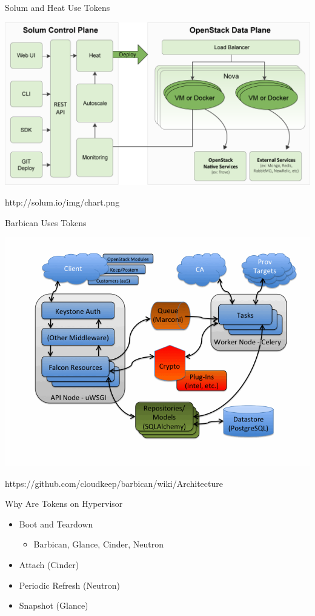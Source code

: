 \documentclass{beamer}
\begin{document}
\begin{frame}{Solum and Heat Use Tokens}
  \begin{block}{}
    \includegraphics[scale=0.3]{solum-arch.png}
  \end{block}
  http://solum.io/img/chart.png
\end {frame}

\begin{frame}{Barbican Uses Tokens}
  \begin{block}{}
    \includegraphics[scale=0.3]{barbican-arch.png}
  \end{block}
  https://github.com/cloudkeep/barbican/wiki/Architecture
\end {frame}


\begin{frame}{Why Are Tokens on Hypervisor}
  \begin{itemize}
  \item Boot and Teardown
    \begin{itemize}
    \item Barbican, Glance, Cinder, Neutron
    \end {itemize}
  \item Attach (Cinder)
  \item Periodic Refresh (Neutron)
  \item Snapshot (Glance)
  \end {itemize}
\end {frame}
\end{document}
